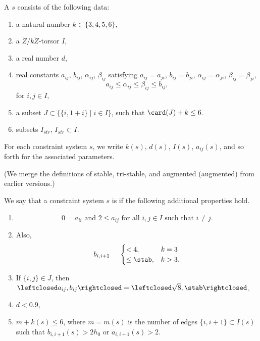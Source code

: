 \begin{definition}
A  $s$ consists of the following data:
\begin{enumerate}
\item a natural number $k\in \{3,4,5,6\}$,
\item a $\ring{Z}/k\ring{Z}$-torsor $I$,
\item a real number $d$,
\item real constants $a_{ij}$, $b_{ij}$, $\alpha_{ij}$, $\beta_{ij}$ satisfying
   $a_{ij} = a_{ji}$, $b_{ij}=b_{ji}$, $\alpha_{ij}=\alpha_{ji}$,
$\beta_{ij}= \beta_{ji}$,  
\[
a_{ij}\le \alpha_{ij}\le \beta_{ij}\le b_{ij},
\]
 for $i,j\in I$,
\item a subset $J\subset \{ \{i,1+i\} \mid i\in I\}$, 
such that $\card(J)+k\le 6$.
\item subsets $I_{str}$, $I_{str} \subset I$.
\end{enumerate}
%
\end{definition}

For each constraint system $s$, we write $k(s)$,
$d(s)$, $I(s)$, $a_{ij}(s)$, and so forth for the associated
parameters.  

(We merge the definitions of stable,  tri-stable, and augmented
(augmented) from earlier versions.)

\begin{definition}  
We say that a constraint system $s$ is  if the following
additional properties hold.
\begin{enumerate}
\item 
\[
0 = a_{ii}\text{ and } 2\le a_{ij} \text{ for all }  i,j\in I \text{ such that } i\ne j.
\]  
\item
  Also, 
\[
  b_{i,i+1} ~\quad \begin{cases}
    < 4, & k = 3\\
    \le \stab, & k > 3.
    \end{cases}
\]  
\item
If $\{i,j\}\in J$, then $\leftclosed
  a_{ij},b_{ij}\rightclosed=\leftclosed\sqrt{8},\stab\rightclosed$.
\item $d < 0.9$,
\item  $m+k(s)\le 6$, where 
$m=m(s)$ is the number of edges $\{i,i+1\}\subset I(s)$ such that
$b_{i ,i+1}(s)> 2h_0$ or $a_{i ,i+1}(s)>2$. 
\end{enumerate}
\end{definition}

